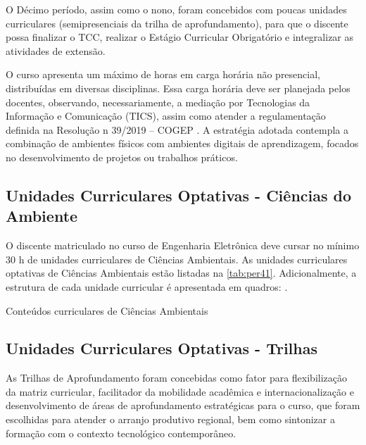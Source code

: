 \clearpage

O Décimo período, assim como o nono, foram concebidos com poucas unidades curriculares (semipresenciais da trilha de aprofundamento), para que o discente possa finalizar o TCC, realizar o Estágio Curricular Obrigatório e integralizar as atividades de extensão.

O curso apresenta um máximo de \the\value{horasANP} horas em carga horária não presencial, distribuídas em diversas disciplinas. Essa carga horária deve ser planejada pelos docentes, observando, necessariamente, a mediação por Tecnologias da Informação e Comunicação (TICS), assim como atender a regulamentação definida na Resolução n\textordmasculine{} 39/2019 – COGEP \cite{cogep39}. A estratégia adotada contempla a combinação de ambientes físicos com ambientes digitais de aprendizagem, focados no desenvolvimento de projetos ou trabalhos práticos.

\subsection{Unidades Curriculares Optativas - Ciências do Ambiente}

O discente matriculado no curso de Engenharia Eletrônica deve cursar no mínimo 30 h de unidades curriculares de Ciências Ambientais. As unidades curriculares optativas de Ciências Ambientais estão listadas na \autoref{tab:per41}. Adicionalmente, a estrutura de cada unidade curricular é apresentada em quadros: . %

\begin{table}[!htb]
	\centering\footnotesize
	\caption{Conteúdos curriculares de Ciências Ambientais}
	\label{tab:per41}
\end{table}

\clearpage



\subsection{Unidades Curriculares Optativas - Trilhas}
\label{subsec:trilhas}

As Trilhas de Aprofundamento foram concebidas como fator para flexibilização da matriz curricular, facilitador da mobilidade acadêmica e internacionalização e desenvolvimento de áreas de aprofundamento estratégicas para o curso, que foram escolhidas para atender o arranjo produtivo regional, bem como sintonizar a formação com o contexto tecnológico contemporâneo.


